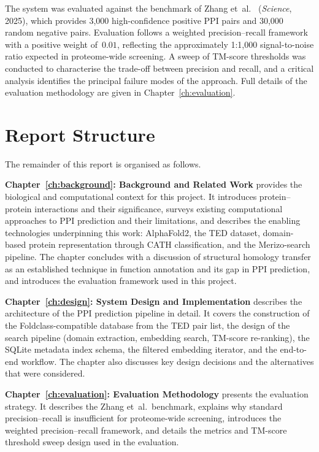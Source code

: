 The system was evaluated against the benchmark of Zhang et~al.~\cite{zhang2025ppi} (\textit{Science}, 2025), which provides 3{,}000 high-confidence positive PPI pairs and 30{,}000 random negative pairs.
Evaluation follows a weighted precision--recall framework with a positive weight of~$0.01$, reflecting the approximately 1:1{,}000 signal-to-noise ratio expected in proteome-wide screening.
A sweep of TM-score thresholds was conducted to characterise the trade-off between precision and recall, and a critical analysis identifies the principal failure modes of the approach.
Full details of the evaluation methodology are given in Chapter~\ref{ch:evaluation}.


\section{Report Structure}
\label{sec:report-structure}

The remainder of this report is organised as follows.

\textbf{Chapter~\ref{ch:background}: Background and Related Work} provides the biological and computational context for this project.
It introduces protein--protein interactions and their significance, surveys existing computational approaches to PPI prediction and their limitations, and describes the enabling technologies underpinning this work: AlphaFold2, the TED dataset, domain-based protein representation through CATH classification, and the Merizo-search pipeline.
The chapter concludes with a discussion of structural homology transfer as an established technique in function annotation and its gap in PPI prediction, and introduces the evaluation framework used in this project.

\textbf{Chapter~\ref{ch:design}: System Design and Implementation} describes the architecture of the PPI prediction pipeline in detail.
It covers the construction of the Foldclass-compatible database from the TED pair list, the design of the search pipeline (domain extraction, embedding search, TM-score re-ranking), the SQLite metadata index schema, the filtered embedding iterator, and the end-to-end workflow.
The chapter also discusses key design decisions and the alternatives that were considered.

\textbf{Chapter~\ref{ch:evaluation}: Evaluation Methodology} presents the evaluation strategy.
It describes the Zhang et~al.\ benchmark, explains why standard precision--recall is insufficient for proteome-wide screening, introduces the weighted precision--recall framework, and details the metrics and TM-score threshold sweep design used in the evaluation.

